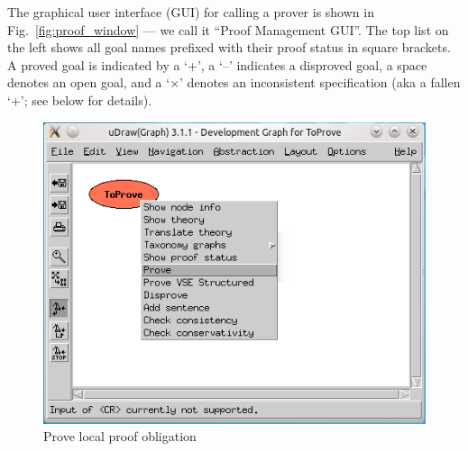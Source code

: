 \documentclass{article}
\begin{document}
The graphical user interface (GUI) for calling a prover is shown in
Fig.~\ref{fig:proof_window} --- we call it ``Proof Management GUI''.
The top list on the left shows all goal names prefixed with their proof
status in square brackets. A proved goal is indicated by a `+', a `–'
indicates a disproved goal, a space denotes an open goal, and a
`$\times$' denotes an inconsistent specification (aka a fallen `+';
see below for details).

\begin{figure}[ht]
  \centering
  \includegraphics[width=0.5\linewidth,keepaspectratio=true]{UserGuideCL_Prove_devGraph}
  \caption{Prove local proof obligation\label{fig:Prove_devGraph}}
\end{figure}
\end{document}
